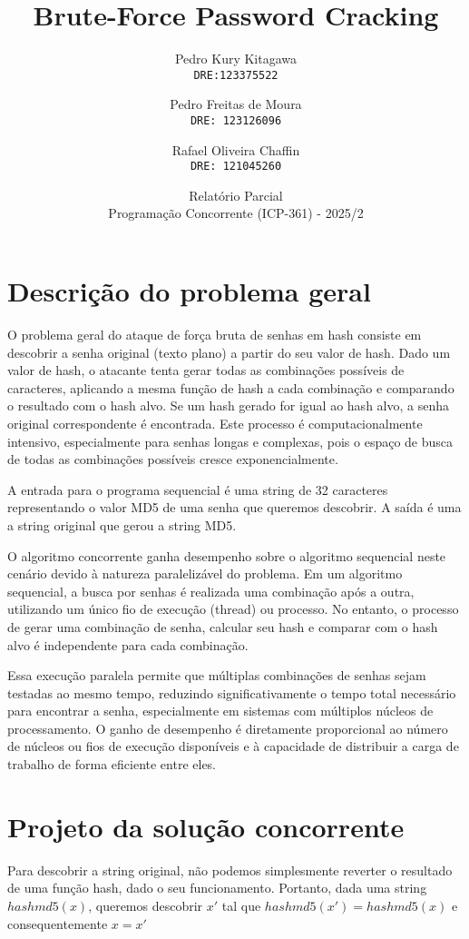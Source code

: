 \documentclass[12pt, a4paper]{article}
\title{Brute-Force Password Cracking}
\author{
  Pedro Kury Kitagawa\\
  \texttt{DRE:123375522}
  \and
  Pedro Freitas de Moura\\
  \texttt{DRE: 123126096}
  \and
  Rafael Oliveira Chaffin\\
  \texttt{DRE: 121045260}
}
\date{Relatório Parcial \\ Programação Concorrente (ICP-361) - 2025/2}
\begin{document}
\maketitle
\thispagestyle{empty}

\section{Descrição do problema geral}
O problema geral do ataque de força bruta de senhas em hash consiste em descobrir a senha original (texto plano) a partir do seu valor de hash. Dado um valor de hash, o atacante tenta gerar todas as combinações possíveis de caracteres, aplicando a mesma função de hash a cada combinação e comparando o resultado com o hash alvo. Se um hash gerado for igual ao hash alvo, a senha original correspondente é encontrada. Este processo é computacionalmente intensivo, especialmente para senhas longas e complexas, pois o espaço de busca de todas as combinações possíveis cresce exponencialmente.

A entrada para o programa sequencial é uma string de 32 caracteres representando o valor MD5 de uma senha que queremos descobrir. A saída é uma a string original que gerou a string MD5.

O algoritmo concorrente ganha desempenho sobre o algoritmo sequencial neste cenário devido à natureza paralelizável do problema. Em um algoritmo sequencial, a busca por senhas é realizada uma combinação após a outra, utilizando um único fio de execução (thread) ou processo. No entanto, o processo de gerar uma combinação de senha, calcular seu hash e comparar com o hash alvo é independente para cada combinação.

Essa execução paralela permite que múltiplas combinações de senhas sejam testadas ao mesmo tempo, reduzindo significativamente o tempo total necessário para encontrar a senha, especialmente em sistemas com múltiplos núcleos de processamento. O ganho de desempenho é diretamente proporcional ao número de núcleos ou fios de execução disponíveis e à capacidade de distribuir a carga de trabalho de forma eficiente entre eles.

\section{Projeto da solução concorrente}
Para descobrir a string original, não podemos simplesmente reverter o resultado de uma função hash, dado o seu funcionamento. Portanto, dada uma string $hashmd5(x)$, queremos descobrir $x'$ tal que $hashmd5(x')=hashmd5(x)$ e consequentemente $x = x'$ 
\end{document}
